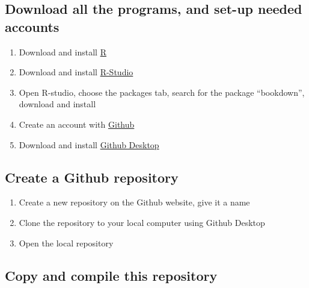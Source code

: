 \documentclass[]{book}
\providecommand{\tightlist}{%
  \setlength{\itemsep}{0pt}\setlength{\parskip}{0pt}}
\theoremstyle{definition}
\theoremstyle{definition}
\theoremstyle{definition}
\theoremstyle{remark}
\begin{document}
\subsection{Download all the programs, and set-up needed
accounts}\label{download-all-the-programs-and-set-up-needed-accounts}

\begin{enumerate}
\def\labelenumi{\arabic{enumi}.}
\tightlist
\item
  Download and install \href{https://www.r-project.org}{R}
\item
  Download and install \href{https://www.rstudio.com}{R-Studio}
\item
  Open R-studio, choose the packages tab, search for the package
  ``bookdown'', download and install
\item
  Create an account with \href{http://www.github.com}{Github}
\item
  Download and install \href{(https://desktop.github.com)}{Github
  Desktop}
\end{enumerate}

\subsection{Create a Github
repository}\label{create-a-github-repository}

\begin{enumerate}
\def\labelenumi{\arabic{enumi}.}
\setcounter{enumi}{5}
\tightlist
\item
  Create a new repository on the Github website, give it a name
\item
  Clone the repository to your local computer using Github Desktop
\item
  Open the local repository
\end{enumerate}

\subsection{Copy and compile this
repository}\label{copy-and-compile-this-repository}
\end{document}
